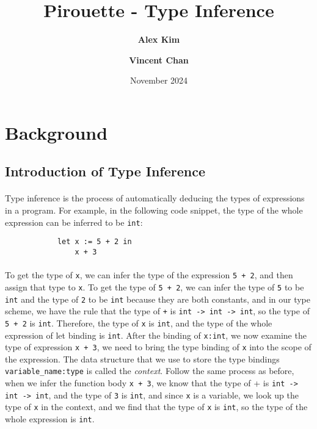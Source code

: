 \documentclass{article}
\title{Pirouette - Type Inference}
\author{\textbf{Alex Kim} \and \textbf{Vincent Chan}}
\date{November 2024}
\begin{document}
\maketitle

\listoffixmes{} %

\section{Background}

\subsection{Introduction of Type Inference}

    \paragraph{}
        Type inference is the process of automatically deducing the types of expressions in a program.
        For example, in the following code snippet, the type of the whole expression can be inferred to be \texttt{int}:
        \begin{verbatim}
            let x := 5 + 2 in
                x + 3
        \end{verbatim}

    \paragraph{}
        To get the type of \texttt{x}, we can infer the type of the expression \texttt{5 + 2}, and then assign that type to \texttt{x}.
        To get the type of \texttt{5 + 2}, we can infer the type of \texttt{5} to be \texttt{int} and the type of \texttt{2} to be \texttt{int}
        because they are both constants, and in our type scheme, we have the rule that the type of \texttt{+} is \texttt{int -> int -> int}, so the type of \texttt{5 + 2} is \texttt{int}.
        Therefore, the type of \texttt{x} is \texttt{int}, and the type of the whole expression of let binding is \texttt{int}. After the binding of \texttt{x:int}, we now examine the type of expression \texttt{x + 3},
        we need to bring the type binding of \texttt{x} into the scope of the expression. The data structure that we use to store the type bindings \texttt{variable\_name:type} is called the \textit{context}.
        Follow the same process as before, when we infer the function body \texttt{x + 3}, we know that the type of {+} is \texttt{int -> int -> int}, and the type of \texttt{3} is \texttt{int},
        and since \texttt{x} is a variable, we look up the type of \texttt{x} in the context, and we find that the type of \texttt{x} is \texttt{int}, so the type of the whole expression is \texttt{int}.
\end{document}
